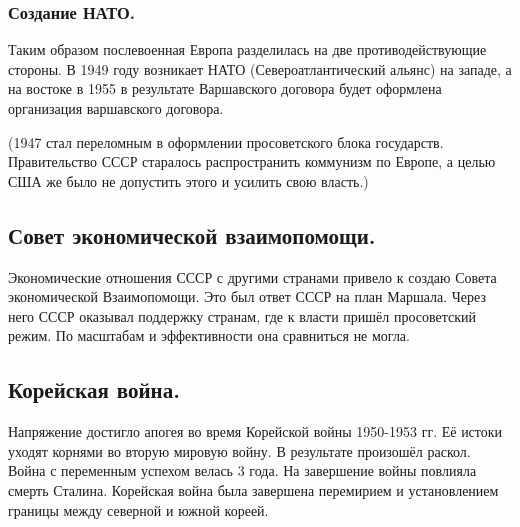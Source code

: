 \subsubsection{\textbf{Создание НАТО.}}

Таким образом послевоенная Европа разделилась на две противодействующие стороны. В 1949 году возникает НАТО (Североатлантический альянс) на западе, а на востоке в 1955 в результате Варшавского договора будет оформлена организация варшавского договора. 

(1947 стал переломным в оформлении просоветского блока государств. Правительство СССР старалось распространить коммунизм по Европе, а целью США же было не допустить этого и усилить свою власть.)

\subsection{Совет экономической взаимопомощи.}

Экономические отношения СССР с другими странами привело к создаю Совета экономической Взаимопомощи. Это был ответ СССР на план Маршала. Через него СССР оказывал поддержку странам, где к власти пришёл просоветский режим. По масштабам и эффективности она сравниться не могла.

\subsection{Корейская война.}

Напряжение достигло апогея во время Корейской войны 1950-1953 гг. Её истоки уходят корнями во вторую мировую войну. В результате произошёл раскол. Война с переменным успехом велась 3 года. На завершение войны повлияла смерть Сталина. Корейская война была завершена перемирием и установлением границы между северной и южной кореей.